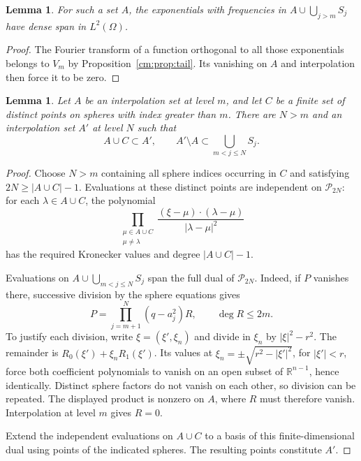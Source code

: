 \documentclass[a4paper,12pt,reqno]{amsart}
\newtheorem{lemma}[theorem]{Lemma}
\theoremstyle{remark}
\numberwithin{equation}{section}
\newcommand{\R}{\mathbb R}
\newcommand{\cP}{\mathcal P}
\begin{document}
\begin{lemma}\label{cm:lem:available}
For such a set $A$, the exponentials with frequencies in
$A\cup\bigcup_{j>m}S_j$ have dense span in $L^2(\Omega)$.
\end{lemma}

\begin{proof}
The Fourier transform of a function orthogonal to all those
exponentials belongs to $V_m$ by Proposition~\ref{cm:prop:tail}.
Its vanishing on $A$ and interpolation then force it to be zero.
\end{proof}

\begin{lemma}\label{cm:lem:extension}
Let $A$ be an interpolation set at level $m$, and let $C$ be a finite
set of distinct points on spheres with index greater than $m$.
There are $N>m$ and an interpolation set $A'$ at level $N$ such that
\[
 A\cup C\subset A',\qquad
 A'\setminus A\subset\bigcup_{m<j\leq N}S_j.
\]
\end{lemma}

\begin{proof}
Choose $N>m$ containing all sphere indices occurring in $C$ and
satisfying $2N\geq|A\cup C|-1$. Evaluations at these distinct
points are independent on $\cP_{2N}$: for each $\lambda\in A\cup C$,
the polynomial
\[
 \prod_{\substack{\mu\in A\cup C\\\mu\ne\lambda}}
 \frac{(\xi-\mu)\cdot(\lambda-\mu)}{|\lambda-\mu|^2}
\]
has the required Kronecker values and degree $|A\cup C|-1$.

Evaluations on $A\cup\bigcup_{m<j\leq N}S_j$ span the full dual
of $\cP_{2N}$. Indeed, if $P$ vanishes there, successive division
by the sphere equations gives
\[
 P=\prod_{j=m+1}^N(q-a_j^2)R,\qquad\deg R\leq2m.
\]
To justify each division, write $\xi=(\xi',\xi_n)$ and divide in
$\xi_n$ by $|\xi|^2-r^2$. The remainder is
$R_0(\xi')+\xi_nR_1(\xi')$. Its values at
$\xi_n=\pm\sqrt{r^2-|\xi'|^2}$, for $|\xi'|<r$, force both
coefficient polynomials to vanish on an open subset of $\R^{n-1}$,
hence identically. Distinct sphere factors do not vanish on each other, so division
can be repeated. The displayed product is nonzero on $A$, where
$R$ must therefore vanish. Interpolation at level $m$ gives $R=0$.

Extend the independent evaluations on $A\cup C$ to a basis of this
finite-dimensional dual using points of the indicated spheres.
The resulting points constitute $A'$.
\end{proof}
\end{document}
